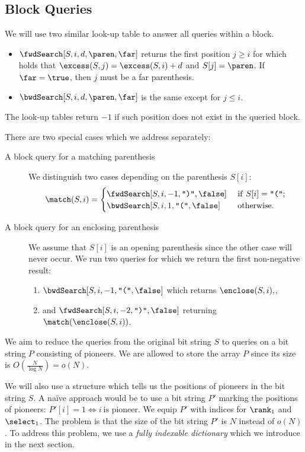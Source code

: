 \subsection{Block Queries}

We will use two similar look-up table to answer all queries within a block.
\begin{itemize}
	\item $\fwdSearch[S, i, d, \paren, \far]$ returns the first position $j \ge i$ for which holds that $\excess(S, j) = \excess(S, i) + d$ and $S[j] = \paren$.
	If $\far = \true$, then $j$ must be a far parenthesis.
	\item $\bwdSearch[S, i, d, \paren, \far]$ is the same except for $j \le i$.
\end{itemize}
The look-up tables return $-1$ if such position does not exist in the queried block.

There are two special cases which we address separately:
\begin{description}
	\item[A block query for a matching parenthesis]
	We distinguish two cases depending on the parenthesis $S[i]$:
	$$\match(S, i) = \begin{cases}
		\fwdSearch[S, i, -1, \closingParen, \false] & \textif S[i] = \openingParen; \\
		\bwdSearch[S, i, 1, \openingParen, \false] & \textotherwise.
	\end{cases}$$
	
	\item[A block query for an enclosing parenthesis]
	We assume that $S[i]$ is an opening parenthesis since the other case will never occur.
	We run two queries for which we return the first non-negative result:
	\begin{enumerate}
		\item $\bwdSearch[S, i, -1, \openingParen, \false]$ which returns $\enclose(S, i),$,
		\item and $\fwdSearch[S, i, -2, \closingParen, \false]$ returning $\match(\enclose(S, i))$.
	\end{enumerate}
\end{description}

\bigbreak

We aim to reduce the queries from the original bit string $S$ to queries on a bit string $P$ consisting of pioneers.
We are allowed to store the array $P$ since its size is $O(\frac{N}{\log N}) = o(N)$.

We will also use a structure which tells us the positions of pioneers in the bit string $S$.
A naïve approach would be to use a bit string $P'$ marking the positions of pioneers: $P'[i] = 1 \iff i\ \textrm{is pioneer}$. We equip $P'$ with indices for $\rank_1$ and $\select_1$.
The problem is that the size of the bit string $P'$ is $N$ instead of $o(N)$.
To address this problem, we use a \emph{fully indexable dictionary} which we introduce in the next section.


